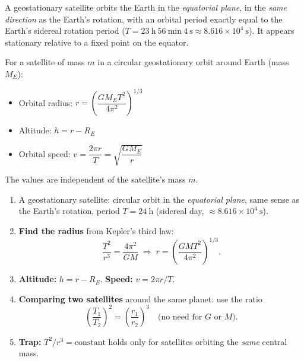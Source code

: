 \documentclass[11pt]{article}
\newcommand{\cle}[1]{{\popxbold\color{popdark}#1}}
\begin{document}
\begin{definition}
A geostationary satellite orbits the Earth in the \emph{equatorial plane}, in the \emph{same direction} as the Earth's rotation, with an orbital period exactly equal to the Earth's sidereal rotation period ($T = 23\ \mathrm{h}\ 56\ \mathrm{min}\ 4\ \mathrm{s} \approx 8.616\times 10^{4}\ \mathrm{s}$). It appears stationary relative to a fixed point on the equator.
\end{definition}

\begin{propriete}
For a satellite of mass $m$ in a circular geostationary orbit around Earth (mass $M_E$):
\begin{itemize}
\item Orbital radius: $r = \left(\dfrac{GM_E T^{2}}{4\pi^{2}}\right)^{1/3}$
\item Altitude: $h = r - R_E$
\item Orbital speed: $v = \dfrac{2\pi r}{T} = \sqrt{\dfrac{GM_E}{r}}$
\end{itemize}
The values are independent of the satellite's mass $m$.
\end{propriete}

\begin{methode}
\begin{enumerate}
\item A \cle{geostationary} satellite: circular orbit in the \emph{equatorial plane}, same sense as the Earth's rotation, period $T = 24\ \mathrm{h}$ (sidereal day, $\approx 8.616\times 10^{4}\ \mathrm{s}$).
\item \textbf{Find the radius} from Kepler's third law:
\[ \frac{T^{2}}{r^{3}} = \frac{4\pi^{2}}{GM} \;\Rightarrow\; r = \left(\frac{GMT^{2}}{4\pi^{2}}\right)^{1/3}. \]
\item \textbf{Altitude:} $h = r - R_E$. \textbf{Speed:} $v = 2\pi r / T$.
\item \textbf{Comparing two satellites} around the same planet: use the ratio
\[ \left(\frac{T_1}{T_2}\right)^{2} = \left(\frac{r_1}{r_2}\right)^{3} \quad\text{(no need for } G \text{ or } M). \]
\item \textbf{Trap:} $T^{2}/r^{3} = \text{constant}$ holds only for satellites orbiting the \emph{same} central mass.
\end{enumerate}
\end{methode}
\end{document}
